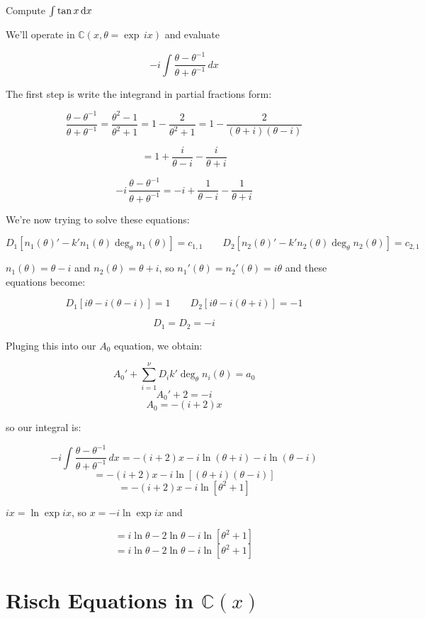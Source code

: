 \example Compute $\int \tan x \, {\rm d}x$

We'll operate in ${\mathbb C}(x, \theta = \exp \,ix)$ and evaluate

$$-i \int \frac{\theta - \theta^{-1}}{\theta + \theta^{-1}} \,dx$$

The first step is write the integrand in partial fractions form:

$$\frac{\theta - \theta^{-1}}{\theta + \theta^{-1}} = \frac{\theta^2 - 1}{\theta^2 + 1}
= 1 - \frac{2}{\theta^2 + 1}
= 1 - \frac{2}{(\theta + i)(\theta - i)} $$

$$ = 1 + \frac{i}{\theta - i} - \frac{i}{\theta + i} $$

$$-i\, \frac{\theta - \theta^{-1}}{\theta + \theta^{-1}} = -i + \frac{1}{\theta - i} - \frac{1}{\theta + i} $$

We're now trying to solve these equations:

$$ D_1 \left[ n_1(\theta)' - k' n_1(\theta) \deg_\theta n_1(\theta) \right] = c_{1,1}
\qquad D_2 \left[ n_2(\theta)' - k' n_2(\theta) \deg_\theta n_2(\theta) \right] = c_{2,1}$$

$n_1(\theta) = \theta -i$ and $n_2(\theta) = \theta + i$, so $n_1'(\theta) = n_2'(\theta) = i \theta$
and these equations become:

$$ D_1 \left[ i \theta - i (\theta -i) \right] = 1
\qquad D_2 \left[ i \theta - i (\theta +i) \right] = -1$$

$$D_1 = D_2 = -i$$

Pluging this into our $A_0$ equation, we obtain:

$$A_0' + \sum_{i=1}^\nu D_i k' \deg_\theta n_i(\theta) = a_0$$
$$A_0' + 2 = -i $$
$$A_0 = -(i+2)x$$

so our integral is:

$$-i \int \frac{\theta - \theta^{-1}}{\theta + \theta^{-1}} \,dx
  = -(i+2)x - i \ln (\theta+i) - i \ln(\theta-i)$$
$$  = -(i+2)x - i \ln \left[ (\theta+i)(\theta-i) \right]$$
$$  = -(i+2)x - i \ln \left[ \theta^2 + 1 \right]$$

$ix = \ln \exp ix$, so $x = -i \ln \exp ix$ and

$$  = i \ln \theta - 2 \ln \theta - i \ln \left[ \theta^2 + 1 \right]$$
$$  = i \ln \theta - 2 \ln \theta - i \ln \left[ \theta^2 + 1 \right]$$

\endexample

\vfill\eject
\section{Risch Equations in ${\mathbb C}(x)$}


